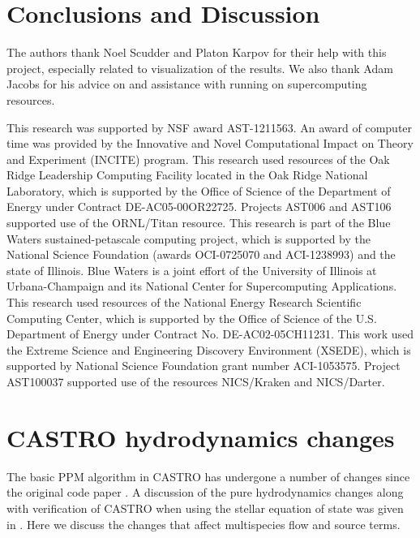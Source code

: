 \documentclass[iop]{emulateapj}
\begin{document}
\section{Conclusions and Discussion}\label{sec:Conclusions and Discussion}


\acknowledgments

The authors thank Noel Scudder and Platon Karpov for their help with 
this project, especially related to visualization of the results. 
We also thank Adam Jacobs for his advice on and assistance with 
running on supercomputing resources.

This research was supported by NSF award AST-1211563. An
award of computer time was provided by the Innovative and Novel
Computational Impact on Theory and Experiment (INCITE) program.  This
research used resources of the Oak Ridge Leadership Computing Facility
located in the Oak Ridge National Laboratory, which is supported by
the Office of Science of the Department of Energy under Contract
DE-AC05-00OR22725. Projects AST006 and AST106 supported use of the ORNL/Titan resource. 
This research is part of the Blue Waters sustained-petascale computing project, 
which is supported by the National Science Foundation (awards OCI-0725070 
and ACI-1238993) and the state of Illinois. Blue Waters is a joint 
effort of the University of Illinois at Urbana-Champaign and its 
National Center for Supercomputing Applications.
This research used resources of the National Energy Research Scientific Computing
Center, which is supported by the Office of Science of the
U.S. Department of Energy under Contract No. DE-AC02-05CH11231.  
This work used the Extreme Science and Engineering Discovery Environment (XSEDE), 
which is supported by National Science Foundation grant number ACI-1053575. 
Project AST100037 supported use of the resources NICS/Kraken and NICS/Darter.

\clearpage





\clearpage
\appendix

\section{CASTRO hydrodynamics changes}

The basic PPM algorithm in CASTRO has undergone a number of changes
since the original code paper \citep{castro}.  A discussion of the
pure hydrodynamics changes along with verification of CASTRO when
using the stellar equation of state was given in
\citet{zingalekatz:2015}.  Here we discuss the changes that affect
multispecies flow and source terms.
\end{document}
